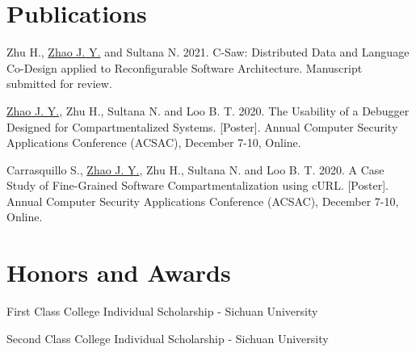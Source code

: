 \documentclass[a4paper]{article}
\begin{document}
\vspace{-5pt}
\section{Publications}
\begin{description}[font=$\bullet$,leftmargin=!]
  \item \small{Zhu H., \underline{Zhao J. Y.} and Sultana N. 2021. C-Saw:
          Distributed Data and Language Co-Design applied to Reconfigurable
          Software Architecture. Manuscript submitted for review.}
  \item \small{\underline{Zhao J. Y.}, Zhu H., Sultana N. and Loo B. T. 2020.
          The Usability of a Debugger Designed for Compartmentalized Systems.
            [Poster]. Annual Computer Security Applications Conference (ACSAC),
          December 7-10, Online.}
  \item \small{Carrasquillo S., \underline{Zhao J. Y.}, Zhu H., Sultana N. and
          Loo B. T. 2020. A Case Study of Fine-Grained Software
          Compartmentalization using cURL. [Poster]. Annual Computer Security
          Applications Conference (ACSAC), December 7-10, Online.}
\end{description}
\vspace{-5pt}

\section{Honors and Awards}
\begin{description}[font=$\bullet$]
  \item {First Class College Individual Scholarship - Sichuan University}
        \vspace{-5pt}
  \item {Second Class College Individual Scholarship - Sichuan University}
        \vspace{-5pt}
\end{description}
\end{document}
